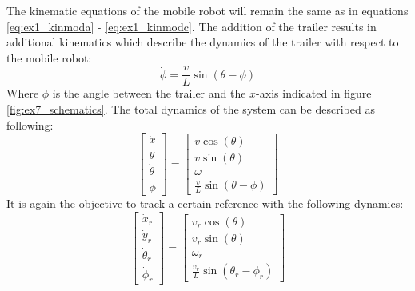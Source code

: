 The kinematic equations of the mobile robot will remain the same as in equations \eqref{eq:ex1_kinmoda} - \eqref{eq:ex1_kinmodc}. The addition of the trailer results in additional kinematics which describe the dynamics of the trailer with respect to the mobile robot:
\begin{equation}
    \dot{\phi} = \frac{v}{L} \sin(\theta - \phi)
    \label{eq:ex7_trailerdyn}
\end{equation}
Where $\phi$ is the angle between the trailer and the $x$-axis indicated in figure \ref{fig:ex7_schematics}. The total dynamics of the system can be described as following:
\begin{equation}
    \begin{bmatrix}
    \dot{x} \\
    \dot{y} \\
    \dot{\theta} \\
    \dot{\phi} 
    \end{bmatrix}
    =
    \begin{bmatrix}
    v \cos(\theta) \\
    v \sin(\theta) \\
    \omega \\
    \frac{v}{L} \sin(\theta - \phi)
    \end{bmatrix}
    \label{eq:ex7_robottrailerdyn}
\end{equation}
It is again the objective to track a certain reference with the following dynamics:
\begin{equation}
    \begin{bmatrix}
    \dot{x}_r \\
    \dot{y}_r \\
    \dot{\theta}_r \\
    \dot{\phi}_r
    \end{bmatrix}
    =
    \begin{bmatrix}
    v_r \cos(\theta) \\
    v_r \sin(\theta) \\
    \omega_r \\
    \frac{v_r}{L} \sin(\theta_r - \phi_r)
    \end{bmatrix}
    \label{eq:ex7_robottrailerrefden}
\end{equation}

